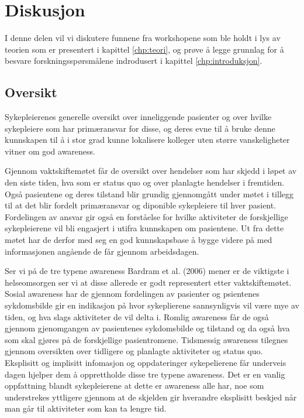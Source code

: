 \chapter{Diskusjon}
\label{chp:diskusjon}
I denne delen vil vi diskutere funnene fra workshopene som ble holdt i lys av teorien som er presentert i kapittel \ref{chp:teori}, og prøve å legge grunnlag for å besvare forskningsspørsmålene indrodusert i kapittel \ref{chp:introduksjon}.

\noindent
\section{Oversikt}
Sykepleierenes generelle oversikt over inneliggende pasienter og over hvilke sykepleiere som har primæransvar for disse, og deres evne til å bruke denne kunnskapen til å i stor grad kunne lokalisere kolleger uten større vanskeligheter vitner om god awareness. 

\noindent
Gjennom vaktskiftemøtet får de oversikt over hendelser som har skjedd i løpet av den siste tiden, hva som er status quo og over planlagte hendelser i fremtiden. Også pasientene og deres tilstand blir grundig gjennomgått under møtet i tillegg til at det blir fordelt primæransvar og diponible sykepleiere til hver pasient. Fordelingen av ansvar gir også en forståelse for hvilke aktiviteter de forskjellige sykepleierene vil bli engasjert i utifra kunnskapen om pasientene. Ut fra dette møtet har de derfor med seg en god kunnskapsbase å bygge videre på med informasjonen angående de får gjennom arbeidsdagen. 

\noindent
Ser vi på de tre typene awareness Bardram et al. (2006) mener er de viktigste i helseomsorgen ser vi at disse allerede er godt representert etter vaktskiftemøtet. Sosial awareness har de gjennom fordelingen av pasienter og psientenes sykdomsbilde gir en indikasjon på hvor sykeplierene sannsynligvis vil være mye av tiden, og hva slags aktiviteter de vil delta i. Romlig awareness får de også gjennom gjenomgangen av pasientenes sykdomsbilde og tilstand og da også hva som skal gjøres på de forskjellige pasientromene. Tidsmessig awareness tilegnes gjennom oversikten over tidligere og planlagte aktiviteter og status quo. Eksplisitt og implisitt infomasjon og oppdateringer sykepelierene får underveis dagen hjelper dem å opprettholde disse tre typene awareness. Det er en vanlig oppfattning blandt sykepleierene at dette er awareness alle har, noe som understrekes yttligere gjennom at de skjelden gir hverandre eksplisitt beskjed når man går til aktiviteter som kan ta lengre tid. 

